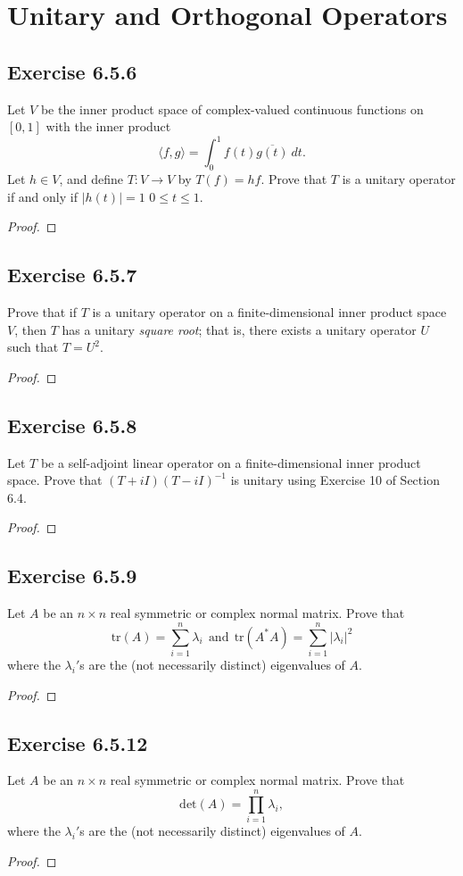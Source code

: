 \section{Unitary and Orthogonal Operators}

\subsection*{Exercise 6.5.6} Let \( V  \) be the inner product space of complex-valued continuous functions on \( [0,1] \) with the inner product 
\[  \langle f , g \rangle = \int_{ 0 }^{ 1 } f(t) \overline{g(t)} \ dt. \]
Let \( h \in V  \), and define \( T: V \to V  \) by \( T(f) = hf \). Prove that \( T  \) is a unitary operator if and only if \( | h(t) | = 1  \) \( 0 \leq t \leq 1  \).
\begin{proof}

\end{proof}

\subsection*{Exercise 6.5.7} Prove that if \( T  \) is a unitary operator on a finite-dimensional inner product space \( V  \), then \( T  \) has a unitary \textit{square root}; that is, there exists a unitary operator \( U  \) such that \( T = U^{2} \).   

\begin{proof}

\end{proof}

\subsection*{Exercise 6.5.8} Let \( T  \) be a self-adjoint linear operator on a finite-dimensional inner product space. Prove that \( (T+iI)(T - iI)^{-1} \) is unitary using Exercise 10 of Section 6.4.

\begin{proof}

\end{proof}

\subsection*{Exercise 6.5.9} Let \( A  \) be an  \( n \times n  \) real symmetric or complex normal matrix. Prove that 
\[  \text{tr}(A) = \sum_{ i=1  }^{ n } {\lambda}_{i} \ \ \text{and} \ \ \text{tr}(A^{*}A) = \sum_{ i=1  }^{ n } | {\lambda}_{i} |^{2} \] 
where the \( {\lambda}_{i}' \)s are the (not necessarily distinct) eigenvalues of \( A  \).
\begin{proof}

\end{proof}

\subsection*{Exercise 6.5.12} Let \( A  \) be an \( n \times n  \) real symmetric or complex normal matrix. Prove that 
\[  \text{det}(A) = \prod_{i=1}^{n} {\lambda}_{i}, \]
where the \( {\lambda}_{i}' \)s are the (not necessarily distinct) eigenvalues of \( A  \).
\begin{proof}

\end{proof}

